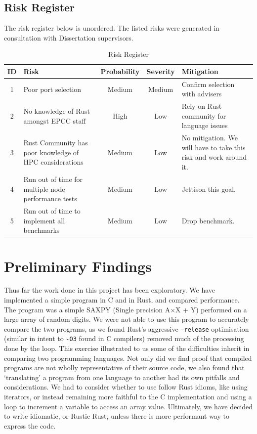 \documentclass{report}[a4]
\begin{document}
\section{Risk Register}
The risk register below is unordered. The listed risks were generated in consultation with Dissertation supervisors.

\begin{table}[h]
  \centering
  \begin{tabular}{c | p{4cm} c c p{4cm}}
  ID & Risk & Probability & Severity & Mitigation \\
    \hline
  1 &  Poor port selection & Medium & Medium & Confirm selection with advisers \\ \hline
  2 &  No knowledge of Rust amongst EPCC staff & High & Low & Rely on Rust community for language issues \\
    \hline
  3&  Rust Community has poor knowledge of HPC considerations & Medium & Low & No mitigation. We will have to take this risk and work around it. \\
    \hline
4 &    Run out of time for multiple node performance tests & Medium & Low & Jettison this goal. \\
\hline
5 & Run out of time to implement all benchmarks & Medium & Low & Drop benchmark. \\
    \end{tabular}
  \caption{Risk Register}
  \label{tab:risk}
\end{table}
\chapter{Preliminary Findings}
Thus far the work done in this project has been exploratory. We have implemented a simple program in C and in Rust, and compared performance. The program was a simple SAXPY (Single precision A$\times$X + Y) performed on a large array of random digits. We were not able to use this program to accurately compare the two programs, as we found Rust's aggressive \texttt{--release} optimisation (similar in intent to \texttt{-O3} found in C compilers) removed much of the processing done by the loop. This exercise illustrated to us some of the difficulties inherit in comparing two programming languages. Not only did we find proof that compiled programs are not wholly representative of their source code, we also found that `translating' a program from one language to another had its own pitfalls and considerations. We had to consider whether to use follow Rust idioms, like using iterators, or instead remaining more faithful to the C implementation and using a loop to increment a variable to access an array value. Ultimately, we have decided to write idiomatic, or Rustic Rust, unless there is more performant way to express the code.
\end{document}
